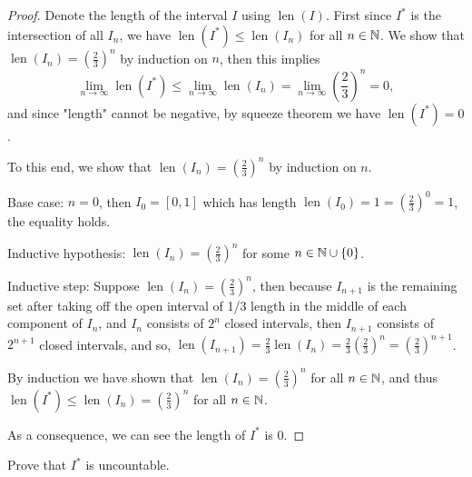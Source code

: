 \documentclass{homework}
\newcommand{\N}{\bb{N}} %
\newcommand{\ra}{\rightarrow}
\newcommand{\?}{\stackrel{?}{=}}
\theoremstyle{definition}
\begin{document}
\begin{proof}
    Denote the length of the interval $I$ using $\operatorname{len}(I)$. First since $I^*$ is the intersection of all $I_n$, we have $\operatorname{len}(I^*)\leq\operatorname{len}(I_n)$ for all $n\in\N$. We show that $\operatorname{len}(I_n)=(\frac{2}{3})^n$ by induction on $n$, then this implies $$\lim_{n\ra\infty}\operatorname{len}(I^*)\leq\lim_{n\ra\infty}\operatorname{len}(I_n)=\lim_{n\ra\infty}(\frac{2}{3})^n=0,$$ and since "length" cannot be negative, by squeeze theorem we have $\operatorname{len}(I^*)=0$.
    
    To this end, we show that $\operatorname{len}(I_n)=(\frac{2}{3})^n$ by induction on $n$. 

    Base case: $n=0$, then $I_0=[0,1]$ which has length $\operatorname{len}(I_0)=1=(\frac{2}{3})^0=1$, the equality holds.

    Inductive hypothesis: $\operatorname{len}(I_n)=(\frac{2}{3})^n$ for some $n\in\N\cup\{0\}$.

    Inductive step: Suppose $\operatorname{len}(I_n)=(\frac{2}{3})^n$, then because $I_{n+1}$ is the remaining set after taking off the open interval of 1/3 length in the middle of each component of $I_n$, and $I_n$ consists of $2^n$ closed intervals, then $I_{n+1}$ consists of $2^{n+1}$ closed intervals, and so, $\operatorname{len}(I_{n+1})=\frac23\operatorname{len}(I_n)=\frac23(\frac{2}{3})^n=(\frac{2}{3})^{n+1}$.

    By induction we have shown that $\operatorname{len}(I_n)=(\frac{2}{3})^n$ for all $n\in\N$, and thus $\operatorname{len}(I^*)\leq\operatorname{len}(I_n)=(\frac{2}{3})^n$ for all $n\in\N$.

    As a consequence, we can see the length of $I^*$ is 0. 
\end{proof}

\question[3] Prove that $I^*$ is uncountable.
\end{document}
